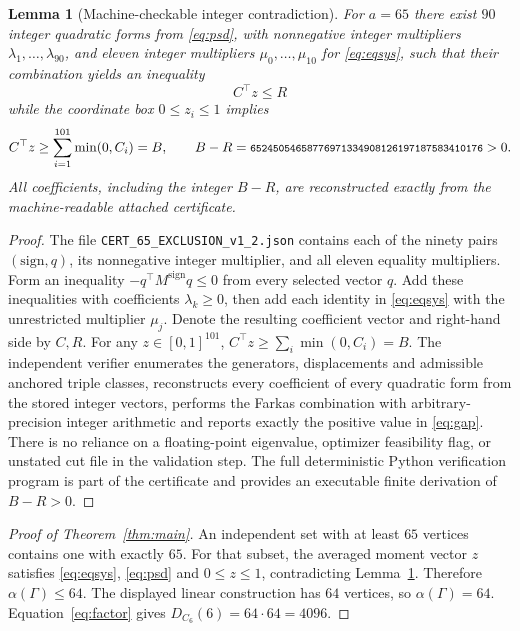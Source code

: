 \documentclass[11pt,a4paper]{article}
\newtheorem{lemma}{Lemma}
\begin{document}
\begin{lemma}[Machine-checkable integer contradiction]\label{lem:cert}
For $a=65$ there exist $90$ integer quadratic forms from \eqref{eq:psd}, with nonnegative integer multipliers $\lambda_1,\ldots,\lambda_{90}$, and eleven integer multipliers $\mu_0,\ldots,\mu_{10}$ for \eqref{eq:eqsys}, such that their combination yields an inequality
\begin{equation}\label{eq:certificate}
C^\top z\le R
\end{equation}
while the coordinate box $0\le z_i\le1$ implies
\begin{equation}\label{eq:gap}
C^\top z\ge \sum_{i=1}^{101}\min(0,C_i)=B,
\qquad B-R=\text{\footnotesize\texttt{65245054658776971334908126197187583410176}}>0.
\end{equation}
All coefficients, including the integer $B-R$, are reconstructed exactly from the machine-readable attached certificate.
\end{lemma}
\begin{proof}
The file \texttt{CERT\_65\_EXCLUSION\_v1\_2.json} contains each of the ninety pairs $(\mathrm{sign},q)$, its nonnegative integer multiplier, and all eleven equality multipliers. Form an inequality $-q^\top M^{\mathrm{sign}}q\le0$ from every selected vector $q$. Add these inequalities with coefficients $\lambda_k\ge0$, then add each identity in \eqref{eq:eqsys} with the unrestricted multiplier $\mu_j$. Denote the resulting coefficient vector and right-hand side by $C,R$. For any $z\in[0,1]^{101}$, $C^\top z\ge\sum_i\min(0,C_i)=B$. The independent verifier enumerates the generators, displacements and admissible anchored triple classes, reconstructs every coefficient of every quadratic form from the stored integer vectors, performs the Farkas combination with arbitrary-precision integer arithmetic and reports exactly the positive value in \eqref{eq:gap}. There is no reliance on a floating-point eigenvalue, optimizer feasibility flag, or unstated cut file in the validation step. The full deterministic Python verification program is part of the certificate and provides an executable finite derivation of $B-R>0$.
\end{proof}

\begin{proof}[Proof of Theorem~\ref{thm:main}]
An independent set with at least $65$ vertices contains one with exactly $65$. For that subset, the averaged moment vector $z$ satisfies \eqref{eq:eqsys}, \eqref{eq:psd} and $0\le z\le1$, contradicting Lemma~\ref{lem:cert}. Therefore $\alpha(\Gamma)\le64$. The displayed linear construction has $64$ vertices, so $\alpha(\Gamma)=64$. Equation~\eqref{eq:factor} gives $D_{C_6}(6)=64\cdot64=4096$.
\end{proof}
\end{document}
